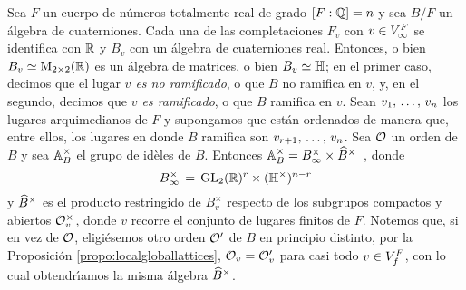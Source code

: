Sea $F$ un cuerpo de n\'{u}meros totalmente real de grado $[F:\bb{Q}]=n$ y
sea $B/F$ un \'{a}lgebra de cuaterniones. Cada una de las completaciones
$F_{v}$ con $v\in\lugares[\infty]{F}$ se identifica con $\bb{R}$ y $B_{v}$
con un \'{a}lgebra de cuaterniones real. Entonces, o bien
\begin{math}
	B_{v}\simeq\MM_{2\times 2}(\bb{R})
\end{math}
es un \'{a}lgebra de matrices, o bien $B_{v}\simeq\bb{H}$; en el primer caso,
decimos que el lugar \emph{$v$ es no ramificado}, o que $B$ no ramifica en $v$,
y, en el segundo, decimos que \emph{$v$ es ramificado}, o que $B$ ramifica en
$v$. Sean $\lista{v}{n}$ los lugares arquimedianos de $F$ y supongamos que
est\'{a}n ordenados de manera que, entre ellos, los lugares en donde $B$
ramifica son $\lista[r+1]{v}{n}$. Sea $\cal{O}$ un orden de $B$ y sea
$\ideles{B}$ el grupo de id\`{e}les de $B$. Entonces
\begin{math}
	\ideles{B}=\Idinf{B}\times\Idfin{B}
\end{math}~,
donde
\begin{equation}
	\label{eq:cuaternionesinfinitounidades}
	\Idinf{B} \,=\,\GL_{2}(\bb{R})^{r}\times (\bb{H}^{\times})^{n-r}
\end{equation}
%
y $\Idfin{B}$ es el producto restringido de $B_{v}^{\times}$ respecto de
los subgrupos compactos y abiertos $\cal{O}_{v}^{\times}$, donde $v$
recorre el conjunto de lugares finitos de $F$. Notemos que, si
en vez de $\cal{O}$, eligi\'{e}semos otro orden $\cal{O}'$ de $B$ en principio
distinto, por la Proposici\'{o}n \ref{propo:localgloballattices},
$\cal{O}_{v}=\cal{O}'_{v}$ para casi todo $v\in\lugares[f]{F}$, con lo cual
obtendr\'{\i}amos la misma \'{a}lgebra $\Idfin{B}$.

